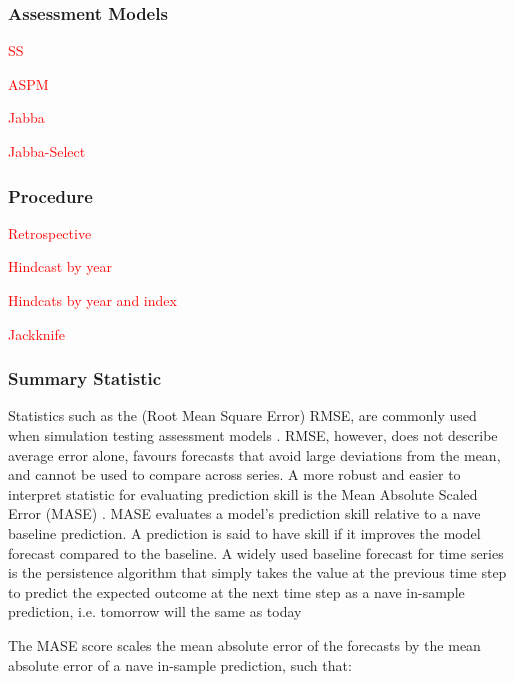 \documentclass[a4paper]{article}
\newcommand{\laurie}{\textcolor{red}}
\newcommand{\laurie}{\textcolor{darkred}}
\begin{document}
\subsubsection{Assessment Models}

\laurie{
\begin{description}
\item{SS}
\item{ASPM}
\item{Jabba}
\item{Jabba-Select}
\end{description}}


\subsubsection{Procedure}

\laurie{
\begin{description}
\item{Retrospective}
\item{Hindcast  by year}
\item{Hindcats by year and index}
\item{Jackknife}
\end{description}}


\subsubsection{Summary Statistic}

Statistics such as the (Root Mean Square Error) RMSE, are commonly used when simulation testing assessment models \citep[e.g.][]{horbowy2011,kell2016xval}. RMSE, however, does not describe average error alone, favours forecasts that avoid large deviations from the mean, and cannot be used to compare across series. A more robust and easier to interpret statistic for evaluating prediction skill is the Mean Absolute Scaled Error (MASE) \citep{Hyndman2006}. MASE evaluates a model’s prediction skill relative to a nave baseline prediction. A prediction is said to have skill if it improves the model forecast compared to the baseline. A widely used baseline forecast for time series is the persistence algorithm that simply takes the value at the previous time step to predict the expected outcome at the next time step as a nave in-sample prediction, i.e. tomorrow will the same as today 

The MASE score scales the mean absolute error of the forecasts by the mean absolute error of a nave in-sample prediction, such that:
\end{document}
